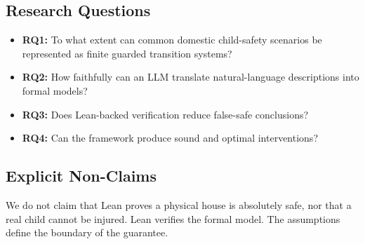 \subsection{Research Questions}
\begin{itemize}
    \item \textbf{RQ1:} To what extent can common domestic child-safety scenarios be represented as finite guarded transition systems?
    \item \textbf{RQ2:} How faithfully can an LLM translate natural-language descriptions into formal models?
    \item \textbf{RQ3:} Does Lean-backed verification reduce false-safe conclusions?
    \item \textbf{RQ4:} Can the framework produce sound and optimal interventions?
\end{itemize}

\subsection{Explicit Non-Claims}
We do not claim that Lean proves a physical house is absolutely safe, nor that a real child cannot be injured. Lean verifies the formal model. The assumptions define the boundary of the guarantee.
